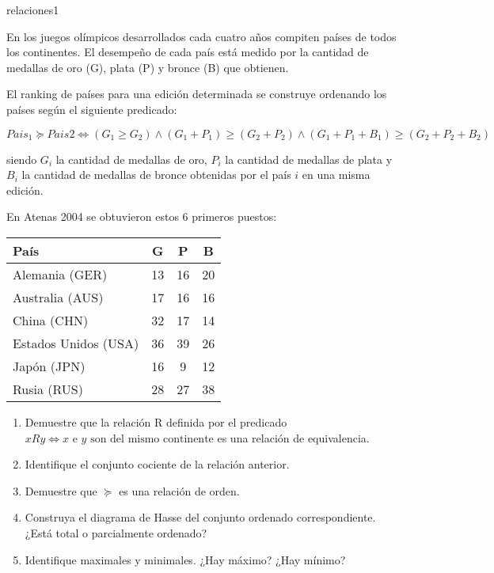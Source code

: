 
\begin{defproblem}{relaciones1}%
 \begin{onlyproblem}%
	En los juegos olímpicos desarrollados cada cuatro años compiten países de todos los continentes. El desempeño de cada país está medido por la cantidad de medallas de oro (G), plata (P) y bronce (B) que obtienen.
	
	El ranking de países para una edición determinada se construye ordenando los países según el siguiente predicado:
	
	\[ Pais_1 \succeq Pais2 \Leftrightarrow (G_1 \ge G_2) \land (G_1 + P_1) \ge (G_2 + P_2) \land (G_1+P_1+B_1) \ge (G_2+P_2+B_2) \]
	
	siendo $ G_i $ la cantidad de medallas de oro, $ P_i $ la cantidad de medallas de plata y $ B_i $ la cantidad de medallas de bronce obtenidas por el país $ i $ en una misma edición.
	
	En Atenas 2004 se obtuvieron estos 6 primeros puestos: 
	
	\begin{tabular}{|lccc|}
		\hline
		País & G & P & B \\
		\hline
		Alemania (GER)  & 13 & 16 & 20 \\
		Australia (AUS)  & 17 & 16 & 16 \\
		China (CHN) & 32 & 17 & 14 \\
		Estados Unidos (USA)  & 36 & 39 & 26 \\
		Japón (JPN)  & 16 & 9 & 12 \\
		Rusia (RUS)  & 28 & 27 & 38 \\
		\hline
	\end{tabular}
	
	\begin{enumerate}
		\item Demuestre que la relación R definida por el predicado $ x R y \Leftrightarrow x \text{ e } y \text{ son del mismo continente} $ es una relación de equivalencia.
		\item Identifique el conjunto cociente de la relación anterior.
		\item Demuestre que $ \succeq $ es una relación de orden.
		\item Construya el diagrama de Hasse del conjunto ordenado correspondiente. ¿Está total o parcialmente ordenado?
		\item Identifique maximales y minimales. ¿Hay máximo? ¿Hay mínimo?
	\end{enumerate}
	
 \end{onlyproblem}%
 \begin{onlysolution}%
 
 \end{onlysolution}%
\end{defproblem}

